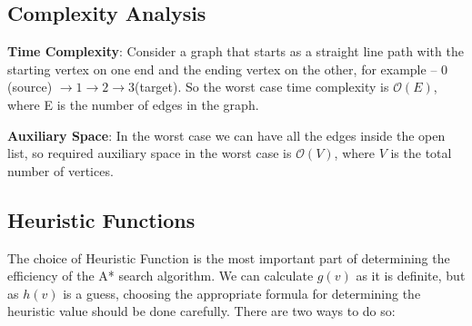 \documentclass{article}
\theoremstyle{definition}
\begin{document}
\subsection{Complexity Analysis}
	
	\textbf{Time Complexity}: Consider a graph that starts as a straight line path with the starting vertex on one end and the ending vertex on the other, for example -- $0$ (source) $\rightarrow 1 \rightarrow 2 \rightarrow3$(target). So the worst case time complexity is $\mathcal{O}(E)$, where E is the number of edges in the graph.
	
	\textbf{Auxiliary Space}: In the worst case we can have all the edges inside the open list, so required auxiliary space in the worst case is $\mathcal{O}(V)$, where $V$ is the total number of vertices.
	
	\subsection{Heuristic Functions}
	The choice of Heuristic Function is the most important part of determining the efficiency of the A* search algorithm. We can calculate $g(v)$ as it is definite, but as $h(v)$ is a guess, choosing the appropriate formula for determining the heuristic value should be done carefully.
	There are two ways to do so:
	
\end{document}
